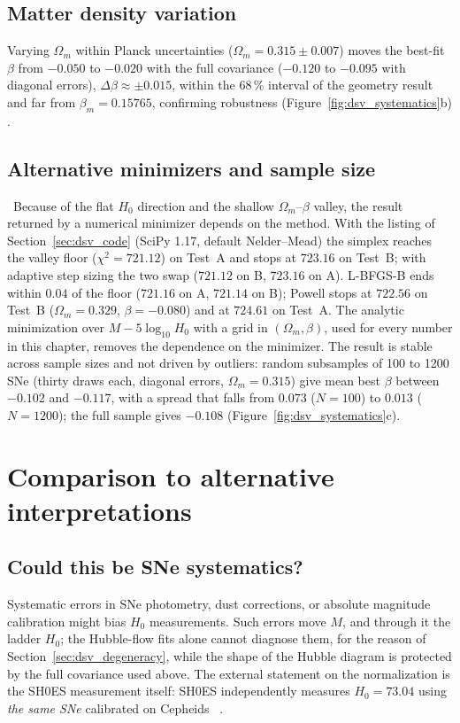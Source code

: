 \subsection{Matter density variation}
Varying $\Omega_m$ within Planck uncertainties ($\Omega_m=0.315\pm0.007$) moves the best-fit $\beta$ from $-0.050$ to $-0.020$ with the full covariance
($-0.120$ to $-0.095$ with diagonal errors), $\Delta\beta\approx\pm0.015$, within the $68\,\%$ interval of the geometry result and far from
$\beta_m=0.15765$, confirming robustness (Figure~\ref{fig:dsv_systematics}b) \calc.

\subsection{Alternative minimizers and sample size}
\calc\ Because of the flat $H_0$ direction and the shallow $\Omega_m$--$\beta$ valley, the result returned by a numerical minimizer depends on the method.
With the listing of Section~\ref{sec:dsv_code} (SciPy 1.17, default Nelder--Mead) the simplex reaches the valley floor ($\chi^2=721.12$) on Test~A and
stops at $723.16$ on Test~B; with adaptive step sizing the two swap ($721.12$ on B, $723.16$ on A). L-BFGS-B ends within $0.04$ of the floor
($721.16$ on A, $721.14$ on B); Powell stops at $722.56$ on Test~B ($\Omega_m=0.329$, $\beta=-0.080$) and at $724.61$ on Test~A. The analytic minimization over $M-5\log_{10}H_0$ with a grid in $(\Omega_m,\beta)$, used for every number in this chapter, removes the dependence
on the minimizer. The result is stable across sample sizes and not driven by outliers: random subsamples of 100 to 1200 SNe (thirty draws each, diagonal
errors, $\Omega_m=0.315$) give mean best $\beta$ between $-0.102$ and $-0.117$, with a spread that falls from $0.073$ ($N=100$) to $0.013$ ($N=1200$); the
full sample gives $-0.108$ (Figure~\ref{fig:dsv_systematics}c).

\section{Comparison to alternative interpretations}\label{sec:dsv_alternatives}
\subsection{Could this be SNe systematics?}
Systematic errors in SNe photometry, dust corrections, or absolute magnitude calibration might bias $H_0$ measurements. Such errors move $M$, and through
it the ladder $H_0$; the Hubble-flow fits alone cannot diagnose them, for the reason of Section~\ref{sec:dsv_degeneracy}, while the shape of the Hubble
diagram is protected by the full covariance used above. The external statement on the normalization is the SH0ES measurement itself: SH0ES independently
measures $H_0=73.04$ using \emph{the same SNe} calibrated on Cepheids~\cite{Riess2022} \observed.

